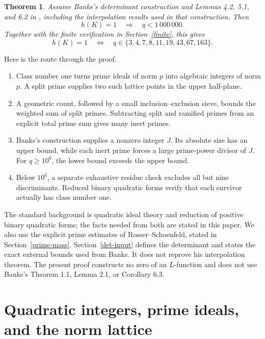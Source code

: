 \documentclass[11pt]{article}
\newtheorem{theorem}{Theorem}
\begin{document}
\begin{samepage}
\begin{theorem}\label{main}
Assume Banks's determinant construction and Lemmas 4.2, 5.1, and 6.2
in \cite{banks}, including the interpolation results used in that
construction. Then
\[
 h(K)=1\quad\Longrightarrow\quad q<1\,000\,000.
\]
Together with the finite verification in Section~\ref{finite}, this gives
\[
 h(K)=1\quad\Longleftrightarrow\quad
 q\in\{3,4,7,8,11,19,43,67,163\}.
\]
\end{theorem}
\end{samepage}

Here is the route through the proof.
\begin{enumerate}
\item Class number one turns prime ideals of norm \(p\) into algebraic
integers of norm \(p\). A split prime supplies two such lattice points
in the upper half-plane.
\item A geometric count, followed by a small inclusion--exclusion sieve,
bounds the weighted sum of split primes. Subtracting split and ramified
primes from an explicit total prime sum gives many inert primes.
\item Banks's construction supplies a nonzero integer \(J\). Its
absolute size has an upper bound, while each inert prime forces a large
prime-power divisor of \(J\). For \(q\ge10^6\), the lower bound exceeds
the upper bound.
\item Below \(10^6\), a separate exhaustive residue check excludes all
but nine discriminants. Reduced binary quadratic forms verify that
each survivor actually has class number one.
\end{enumerate}

The standard background is quadratic ideal theory and reduction of
positive binary quadratic forms; the facts needed from both are stated
in this paper. We also use the explicit prime estimates of
Rosser--Schoenfeld, stated in Section~\ref{prime-mass}.
Section~\ref{det-input} defines the determinant and states the exact
external bounds used from Banks. It does not reprove his interpolation
theorem. The present proof constructs no zero of an \(L\)-function and
does not use Banks's Theorem 1.1, Lemma 2.1, or Corollary 6.3.

\section{Quadratic integers, prime ideals, and the norm lattice}\label{background}
\end{document}
